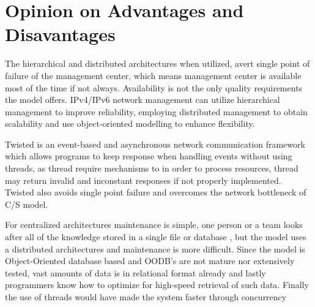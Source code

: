 %
\section{Opinion on Advantages and Disavantages}
\par{
The hierarchical and distributed architectures when utilized, avert single point of failure of the management center, which means management center is available most of the time if not always. Availability is not the only quality requirements the model offers. IPv4/IPv6 network management can utilize hierarchical management to improve reliability, employing distributed management to obtain scalability and use object-oriented modelling to enhance flexibility.
}
\newline
\par{
Twisted is an event-based and asynchronous network communication framework which allows programs to keep response when handling events without using threads, as thread require mechanisms to in order to process resources, thread may return invalid and inconstant responses if not properly implemented. Twisted also avoids single point failure and overcomes the network bottleneck of C/S model.
}
\newline
\par{
For centralized architectures maintenance is simple, one person or a team looks after all of the knowledge stored in a single file or database , but the model uses a distributed architectures and maintenance is more difficult. Since the model is Object-Oriented database based and OODB's are not mature nor extensively tested, vast amounts of data is in relational format already and lastly programmers know how to optimize for high-speed retrieval of such data. Finally the use of threads would have made the system faster through concurrency
}
%